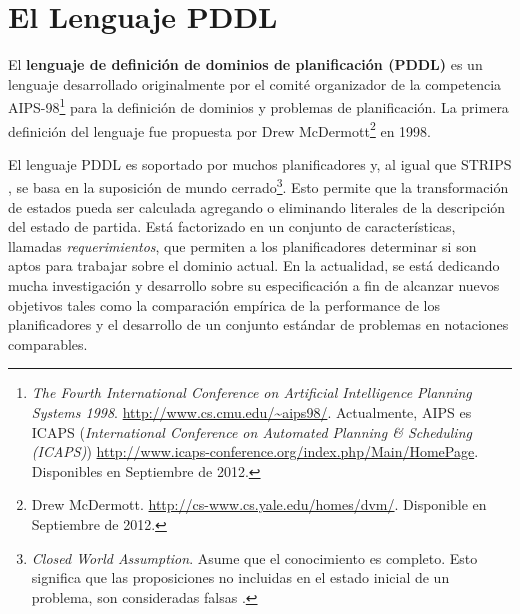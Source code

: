 

%




\chapter{El Lenguaje PDDL} \label{pagcap2}


El {\bf lenguaje de definici\'on de dominios de planificaci\'on (PDDL)} 
es un lenguaje de\-sa\-rro\-lla\-do originalmente por el comit\'e organizador 
de la competencia AIPS-98\footnote{\emph{The Fourth International Conference
on Artificial Intelligence Planning Systems 1998}. \url{http://www.cs.cmu.edu/~aips98/}. 
Actualmente, AIPS es ICAPS (\emph{International Conference 
on Automated Planning \& Scheduling (ICAPS)})
\url{http://www.icaps-conference.org/index.php/Main/HomePage}. Disponibles
en Septiembre de 2012.}
para la definici\'on de dominios y problemas de planificaci\'on.
La primera definici\'on del lenguaje fue propuesta por 
Drew McDermott\footnote{Drew
  McDermott. \url{http://cs-www.cs.yale.edu/homes/dvm/}. Disponible en
Septiembre de 2012.} en 1998. 


El lenguaje PDDL es soportado por muchos planificadores y, al igual
que STRIPS \cite{fn:str}, 
se basa en la suposici\'on de mundo cerrado\footnote{\emph{Closed World Assumption}. 
Asume que el conocimiento es completo. Esto significa que las proposiciones no incluidas en el estado 
inicial de un problema, son consideradas falsas \cite{poole:_artif_intel}.}. Esto permite 
que la transformaci\'on de estados pueda ser calculada agregando o eliminando literales de 
la descripci\'on del estado de partida. Est\'a factorizado en un conjunto de caracter\'isticas, 
llamadas \emph{requerimientos}, que permiten 
a los planificadores determinar si son aptos para trabajar sobre el dominio actual. 
En la actualidad, se est\'a dedicando mucha investigaci\'on y desarrollo sobre su 
especificaci\'on a fin de alcanzar nuevos objetivos tales como la comparaci\'on emp\'irica 
de la performance de los planificadores y el desarrollo de un conjunto est\'andar de 
problemas en notaciones comparables.

